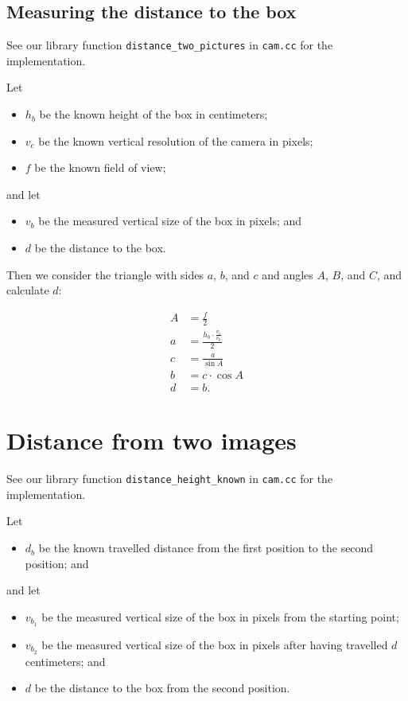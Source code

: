 \documentclass[a4paper,12pt]{article}
\begin{document}
\subsection{Measuring the distance to the box}

See our library function \texttt{distance_two_pictures} in \texttt{cam.cc} for
the implementation.

Let
\begin{itemize}
\item $h_b$ be the known height of the box in centimeters;
\item $v_c$ be the known vertical resolution of the camera in pixels;
\item $f$ be the known field of view;
\end{itemize}

and let
\begin{itemize}
\item $v_b$ be the measured vertical size of the box in pixels; and
\item $d$ be the distance to the box.
\end{itemize}

Then we consider the triangle with sides $a$, $b$, and $c$ and angles $A$, $B$,
and $C$, and calculate $d$:

\begin{align*}
  A &= \frac{f}{2}\\
  a &= \frac{h_b \cdot \frac{v_c}{v_b}}{2}\\
  c &= \frac{a}{\sin A}\\
  b &= c \cdot \cos A\\
  d &= b.
\end{align*}


\section{Distance from two images}

See our library function \texttt{distance_height_known} in \texttt{cam.cc} for
the implementation.

Let

\begin{itemize}
\item $d_b$ be the known travelled distance from the first position to the
second position; and
\end{itemize}

and let

\begin{itemize}
\item $v_{b_1}$ be the measured vertical size of the box in pixels from the
starting point;
\item $v_{b_2}$ be the measured vertical size of the box in pixels after having
travelled $d$ centimeters; and
\item $d$ be the distance to the box from the second position.
\end{itemize}
\end{document}
